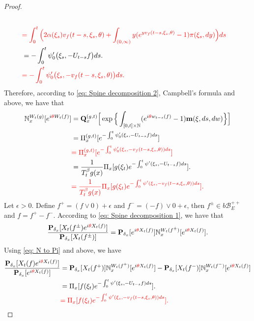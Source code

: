 \documentclass[12pt,oneside,english]{amsart}
\theoremstyle{plain}
\theoremstyle{definition}
\numberwithin{equation}{section}
\begin{document}
\begin{proof}
\begin{align}
    \\&{\color{red}=\int_0^t \Big( 2\alpha(\xi_s) v_f(t-s,\xi_s,\theta) + \int_{(0,\infty)} y (e^{y v_f(t-s,\xi_s,\theta)} - 1) \pi(\xi_s,dy) \Big) ds}
    \\&= -\int_0^t \psi'_0 \big(\xi_s, -U_{t-s}f\big)ds.
    \\&{\color{red}= -\int_0^t \psi'_0 \big(\xi_s, -v_f(t-s,\xi_s,\theta)\big)ds.}
\end{align}
    Therefore, according to \eqref{eq: Spine decomposition 2}, Campbell's formula and above, we have that
\begin{align}
\label{eq: N to Pi}
    \mathbb N_x^{W_t(g)}[e^{i{\color{red}\theta} W_t(f)}]
    &=\mathbf Q_x^{(g,t)} \Big[\exp\Big\{\int_{[0,t]\times \mathbb N}(e^{i{\color{red}\theta} w_{t-s}(f)} - 1) \mathbf m(\xi, ds,dw)\Big\}\Big]
    \\&= \Pi_x^{(g,t)} [e^{-\int_0^t \psi'_0(\xi_s, -U_{t-s}f)ds}]
    \\&{\color{red}= \Pi_x^{(g,t)} [e^{-\int_0^t \psi'_0(\xi_s, -v_f(t-s,\xi_s,\theta))ds}]}
    \\&= \frac{1}{T_t^\beta g (x)} \Pi_x[ g(\xi_t) e^{-\int_0^t \psi'(\xi_s, -U_{t-s}f)ds} ].
    \\&{\color{red}= \frac{1}{T_t^\beta g (x)} \Pi_x[ g(\xi_t) e^{-\int_0^t \psi'(\xi_s, -v_f(t-s,\xi_s,\theta))ds} ].}
\end{align}
    Let $\epsilon >0$.
    Define $f^+ = (f \vee 0) + \epsilon$ and $f^- = (-f) \vee 0 + \epsilon$, then $f^\pm \in b\mathscr B^{++}_E$ and $f = f^+ - f^-$.
    According to \eqref{eq: Spine decomposition 1}, we have that
\begin{equation}
    \frac{\mathbf P_{\delta_x}[X_t(f^{\pm})e^{i{\color{red}\theta} X_t(f)}]}{\mathbf P_{\delta_x}[X_t(f^{\pm})]}
    = \mathbf P_{\delta_x}[e^{i{\color{red}\theta} X_t(f)}] \mathbb N_x^{W_t(f^{\pm})}[e^{i{\color{red}\theta} X_t(f)}].
\end{equation}
    Using \eqref{eq: N to Pi} and above, we have
\begin{align}
    \frac{\mathbf P_{\delta_x}[X_t(f)e^{i \deleted{\theta} X_t(f)}] }{\mathbf P_{\delta_x}[e^{i\deleted{\theta} X_t(f)}]}
    &= \mathbf P_{\delta_x}[X_t(f^+)] \mathbb N_x^{W_t(f^+)} [e^{i\deleted{\theta} X_t(f)}] - \mathbf P_{\delta_x}[X_t(f^-)]\mathbb N_x^{W_t(f^-)}[e^{i\deleted{\theta} X_t(f)}]
    \\& = \Pi_x[ f(\xi_t) e^{- \int_0^t \psi'(\xi_s, -U_{t-s}f) ds}  ].
    \\& \deleted{= \Pi_x[ f(\xi_t) e^{- \int_0^t \psi'(\xi_s, -v_f(t-s,\xi_s,\theta)) ds}  ].}

\end{align}
\end{proof}
\end{document}
